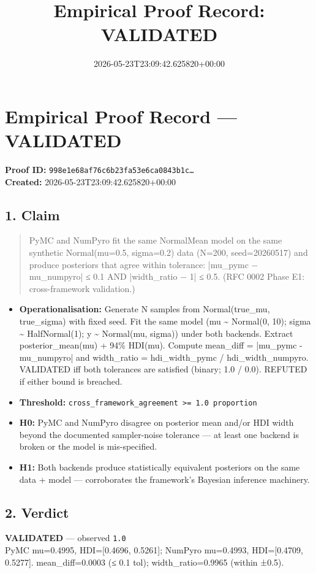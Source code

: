 \documentclass{article}
\title{Empirical Proof Record: VALIDATED}
\date{2026-05-23T23:09:42.625820+00:00}
\begin{document}
\maketitle
\section*{Empirical Proof Record --- \textcolor{validated}{\textbf{VALIDATED}}}
\textbf{Proof ID:} \texttt{998e1e68af76c6b23fa53e6ca0843b1c\dots}\\
\textbf{Created:} 2026-05-23T23:09:42.625820+00:00
\subsection*{1. Claim}
\begin{quote}PyMC and NumPyro fit the same NormalMean model on the same synthetic Normal(mu=0.5, sigma=0.2) data (N=200, seed=20260517) and produce posteriors that agree within tolerance: |mu\_pymc − mu\_numpyro| ≤ 0.1 AND |width\_ratio − 1| ≤ 0.5. (RFC 0002 Phase E1: cross-framework validation.)\end{quote}
\begin{itemize}
\item \textbf{Operationalisation:} Generate N samples from Normal(true\_mu, true\_sigma) with fixed seed. Fit the same model (mu \textasciitilde{} Normal(0, 10); sigma \textasciitilde{} HalfNormal(1); y \textasciitilde{} Normal(mu, sigma)) under both backends. Extract posterior\_mean(mu) + 94\% HDI(mu). Compute mean\_diff = |mu\_pymc - mu\_numpyro| and width\_ratio = hdi\_width\_pymc / hdi\_width\_numpyro. VALIDATED iff both tolerances are satisfied (binary; 1.0 / 0.0). REFUTED if either bound is breached.
\item \textbf{Threshold:} \texttt{cross\_framework\_agreement >= 1.0 proportion}
\item \textbf{H0:} PyMC and NumPyro disagree on posterior mean and/or HDI width beyond the documented sampler-noise tolerance — at least one backend is broken or the model is mis-specified.
\item \textbf{H1:} Both backends produce statistically equivalent posteriors on the same data + model — corroborates the framework's Bayesian inference machinery.
\end{itemize}
\subsection*{2. Verdict}
\textcolor{validated}{\textbf{VALIDATED}} --- observed \texttt{1.0}\\
PyMC mu=0.4995, HDI=[0.4696, 0.5261]; NumPyro mu=0.4993, HDI=[0.4709, 0.5277]. mean\_diff=0.0003 (≤ 0.1 tol); width\_ratio=0.9965 (within ±0.5).
\end{document}
